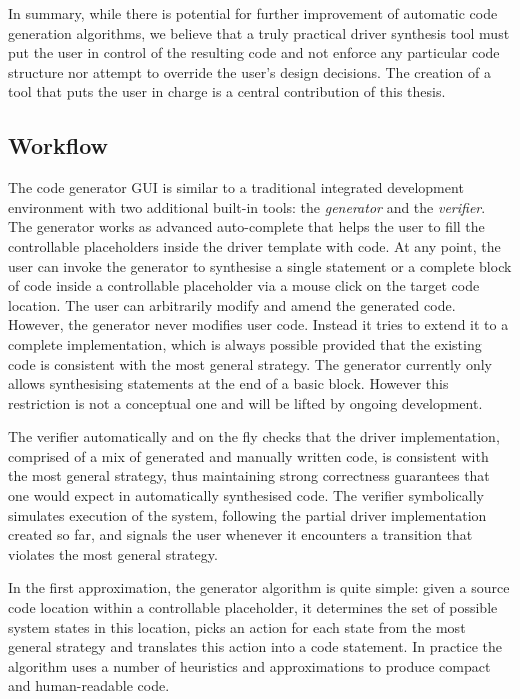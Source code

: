 In summary, while there is potential for further improvement of automatic code generation algorithms, we believe that a truly practical driver synthesis tool must put the user in control of the resulting code and not enforce any particular code structure nor attempt to override the user's design decisions. The creation of a tool that puts the user in charge is a central contribution of this thesis.

\subsection{Workflow}
\label{sec:workflow}

The \termite code generator GUI is similar to a traditional integrated development environment with two additional built-in tools: the \emph{generator} and the \emph{verifier}.  The generator works as advanced auto-complete that helps the user to fill the controllable placeholders inside the driver template with code.  At any point, the user can invoke the generator to synthesise a single statement or a complete block of code inside a controllable placeholder via a mouse click on the target code location.  The user can arbitrarily modify and amend the generated code.  However, the generator never modifies user code.  Instead it tries to extend it to a complete implementation, which is always possible provided that the existing code is consistent with the most general strategy.  The generator currently only allows synthesising statements at the end of a basic block.  However this restriction is not a conceptual one and will be lifted by ongoing development.

The verifier automatically and on the fly checks that the driver implementation, comprised of a mix of generated and manually written code, is consistent with the most general strategy, thus maintaining strong correctness guarantees that one would expect in automatically synthesised code.  The verifier symbolically simulates execution of the system, following the partial driver implementation created so far, and signals the user whenever it encounters a transition that violates the most general strategy.

In the first approximation, the generator algorithm is quite simple: given a source code location within a controllable placeholder, it determines the set of possible system states in this location, picks an action for each state from the most general strategy and translates this action into a code statement.  In practice the algorithm uses a number of heuristics and approximations to produce compact and human-readable code. 


